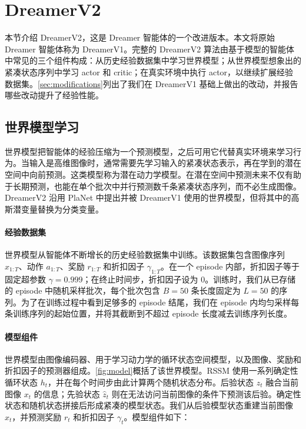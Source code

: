 \section{DreamerV2}
\label{sec:method}

本节介绍 DreamerV2，这是 Dreamer 智能体\citep{hafner2019dreamer}的一个改进版本。本文将原始 Dreamer 智能体称为 DreamerV1。完整的 DreamerV2 算法由基于模型的智能体中常见的三个组件构成\citep{sutton1991dyna}：从历史经验数据集中学习世界模型；从世界模型想象出的紧凑状态序列中学习 actor 和 critic；在真实环境中执行 actor，以继续扩展经验数据集。\cref{sec:modifications}列出了我们在 DreamerV1 基础上做出的改动，并报告哪些改动提升了经验性能。

\subsection{世界模型学习}

世界模型把智能体的经验压缩为一个预测模型，之后可用它代替真实环境来学习行为。当输入是高维图像时，通常需要先学习输入的紧凑状态表示，再在学到的潜在空间中向前预测\citep{watter2015e2c,karl2016dvbf,ha2018worldmodels}。这类模型称为潜在动力学模型。在潜在空间中预测未来不仅有助于长期预测，也能在单个批次中并行预测数千条紧凑状态序列，而不必生成图像。DreamerV2 沿用 PlaNet \citep{hafner2018planet} 中提出并被 DreamerV1 使用的世界模型，但将其中的高斯潜变量替换为分类变量。



\paragraph{经验数据集}

世界模型从智能体不断增长的历史经验数据集中训练。该数据集包含图像序列 $x_{1:T}$、动作 $a_{1:T}$、奖励 $r_{1:T}$ 和折扣因子 $\gamma_{1:T}$。在一个 episode 内部，折扣因子等于固定超参数 $\gamma=0.999$；在终止时间步，折扣因子设为 0。训练时，我们从已存储的 episode 中随机采样批次，每个批次包含 $B=50$ 条长度固定为 $L=50$ 的序列。为了在训练过程中看到足够多的 episode 结尾，我们在 episode 内均匀采样每条训练序列的起始位置，并将其截断到不超过 episode 长度减去训练序列长度。

\paragraph{模型组件}

世界模型由图像编码器、用于学习动力学的循环状态空间模型\citep[RSSM;][]{hafner2018planet}，以及图像、奖励和折扣因子的预测器组成。\cref{fig:model}概括了该世界模型。RSSM 使用一系列确定性循环状态 $h_t$，并在每个时间步由此计算两个随机状态分布。后验状态 $z_t$ 融合当前图像 $x_t$ 的信息；先验状态 $\hat{z}_t$ 则在无法访问当前图像的条件下预测该后验。确定性状态和随机状态拼接后形成紧凑的模型状态。我们从后验模型状态重建当前图像 $x_t$，并预测奖励 $r_t$ 和折扣因子 $\gamma_t$。模型组件如下：

